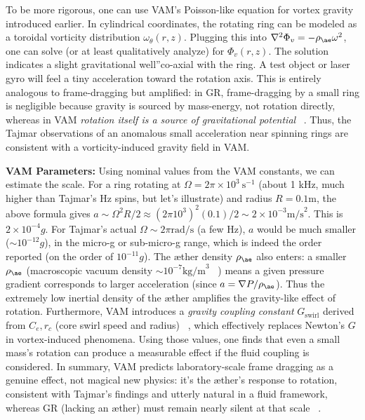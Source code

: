 \documentclass[a4paper, aps,preprint,superscriptaddress, 12pt]{revtex4}
\begin{document}
To be more rigorous, one can use VAM's Poisson-like equation for vortex gravity introduced earlier. In cylindrical coordinates, the rotating ring can be modeled as a toroidal vorticity distribution $\omega_\theta(r,z)$. Plugging this into $\nabla^2\Phi_v = -\rho_{\ae}\omega^2$, one can solve (or at least qualitatively analyze) for $\Phi_v(r,z)$. The solution indicates a slight \grqq gravitational well\textquotedblright co-axial with the ring. A test object or laser gyro will feel a tiny acceleration toward the rotation axis. This is entirely analogous to frame-dragging but amplified: in GR, frame-dragging by a small ring is negligible because gravity is sourced by mass-energy, not rotation directly, whereas in VAM \textit{rotation itself is a source of gravitational potential}~\cite{Iskandarani2025b} . Thus, the Tajmar observations of an anomalous small acceleration near spinning rings are consistent with a vorticity-induced gravity field in VAM.


\textbf{VAM Parameters:} Using nominal values from the VAM constants, we can estimate the scale. For a ring rotating at $\Omega = 2\pi\times10^3~\text{s}^{-1}$ (about 1 kHz, much higher than Tajmar's Hz spins, but let's illustrate) and radius $R=0.1\text{m}$, the above formula gives $a \sim \Omega^2 R /2 \approx (2\pi 10^3)^2(0.1)/2 \sim 2\times10^{-3}\text{m/s}^2$. This is $2\times10^{-4}g$. For Tajmar's actual $\Omega \sim 2\pi\text{rad/s}$ (a few Hz), $a$ would be much smaller ($\sim10^{-12}g$), in the micro-g or sub-micro-g range, which is indeed the order reported (on the order of $10^{-11}g$). The æther density $\rho_{\ae}$ also enters: a smaller $\rho_{\ae}$ (macroscopic vacuum density $\sim10^{-7}\text{kg/m}^3$~\cite{VAM_constants} ) means a given pressure gradient corresponds to larger acceleration (since $a = \nabla P/\rho_{\ae}$). Thus the extremely low inertial density of the æther amplifies the gravity-like effect of rotation. Furthermore, VAM introduces a \textit{gravity coupling constant} $G_{\text{swirl}}$ derived from $C_e, r_c$ (core swirl speed and radius)~\cite{Iskandarani2025b} , which effectively replaces Newton's $G$ in vortex-induced phenomena. Using those values, one finds that even a small mass's rotation can produce a measurable effect if the fluid coupling is considered. In summary, VAM predicts laboratory-scale frame dragging as a genuine effect, not magical new physics: it's the æther's response to rotation, consistent with Tajmar's findings and utterly natural in a fluid framework, whereas GR (lacking an æther) must remain nearly silent at that scale~\cite{Iskandarani2025b} .
\end{document}
